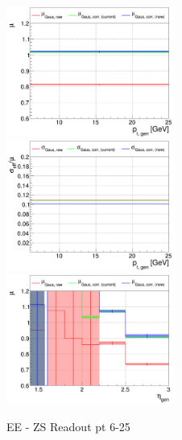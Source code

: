 \begin{figure}
\includegraphics[width=0.495\textwidth]{./plots_pdf/ECAL_plots/plotsPU/EE/ZS/pdf/GENPT/EEZS_GENPT_0006_0025_MuOverBins.pdf}
\includegraphics[width=0.495\textwidth]{./plots_pdf/ECAL_plots/plotsPU/EE/ZS/pdf/GENPT/EEZS_GENPT_0006_0025_EffSigmaOverBins.pdf}
\includegraphics[width=0.495\textwidth]{./plots_pdf/ECAL_plots/plotsPU/EE/ZS/pdf/GENETA/EEZS_GENETA_0006_0025_MuOverBins.pdf}
\caption{EE - ZS Readout pt 6-25}
\end{figure}






